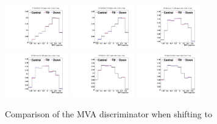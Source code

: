 \begin{description}
\begin{figure}[hbtp]
 \begin{center}
   \includegraphics[width=0.245\textwidth]{Figures/Analysis_2_Diagrams/SystPlot_CMS_ttH_CSVHFStats1_ttH125_ljets_jge6_tge4}
   \includegraphics[width=0.245\textwidth]{Figures/Analysis_2_Diagrams/SystPlot_CMS_ttH_CSVHFStats2_ttH125_ljets_jge6_tge4}
   \includegraphics[width=0.245\textwidth]{Figures/Analysis_2_Diagrams/SystPlot_CMS_ttH_CSVHFStats1_ttbarPlusBBbar_ljets_jge6_tge4}
   \includegraphics[width=0.245\textwidth]{Figures/Analysis_2_Diagrams/SystPlot_CMS_ttH_CSVHFStats2_ttbarPlusBBbar_ljets_jge6_tge4}
   \includegraphics[width=0.245\textwidth]{Figures/Analysis_2_Diagrams/SystPlot_CMS_ttH_CSVHFStats1_ttbar_ljets_jge6_tge4}
   \includegraphics[width=0.245\textwidth]{Figures/Analysis_2_Diagrams/SystPlot_CMS_ttH_CSVHFStats2_ttbar_ljets_jge6_tge4}
   \caption{ Comparison of the MVA discriminator when shifting to
}
\end{center}
\end{figure}
\end{description}

